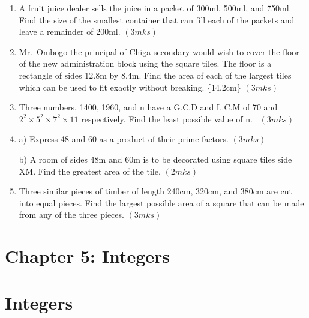 \documentclass[
  a4paperpaper,
]{scrbook}
\begin{document}
\begin{tcolorbox}
\begin{enumerate}
\item
  A fruit juice dealer sells the juice in a packet of 300ml, 500ml, and
  750ml. Find the size of the smallest container that can fill each of
  the packets and leave a remainder of 200ml.\hspace{0.6cm} \((3mks)\)
\item
  Mr.~Ombogo the principal of Chiga secondary would wish to cover the
  floor of the new administration block using the square tiles. The
  floor is a rectangle of sides 12.8m by 8.4m. Find the area of each of
  the largest tiles which can be used to fit exactly without breaking.
  \hspace*\{14.2cm\} \((3mks)\)
\item
  Three numbers, 1400, 1960, and n have a G.C.D and L.C.M of 70 and
  \(2^2\times 5^2\times 7^2 \times 11\) respectively. Find the least
  possible value of n.~\hspace{8.8cm} \((3mks)\)
\item
  a) Express 48 and 60 as a product of their prime factors.
  \hspace{11cm} \((3mks)\)

  b) A room of sides 48m and 60m is to be decorated using square tiles
  side XM. Find the greatest area of the tile. \hspace{9.2cm} \((2mks)\)
\item
  Three similar pieces of timber of length 240cm, 320cm, and 380cm are
  cut into equal pieces. Find the largest possible area of a square that
  can be made from any of the three pieces. \hspace{14.2cm} \((3mks)\)
\end{enumerate}

\end{tcolorbox}


\hypertarget{chapter-5-integers}{%
\chapter{Chapter 5: Integers}\label{chapter-5-integers}}


\hypertarget{integers}{%
\chapter*{Integers}\label{integers}}

\end{document}

